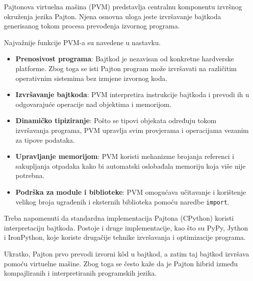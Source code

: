 Pajtonova virtuelna mašina (PVM) predstavlja centralnu komponentu izvršnog okruženja jezika Pajton. Njena osnovna uloga jeste izvršavanje bajtkoda generisanog tokom procesa prevođenja izvornog programa.

Najvažnije funkcije PVM-a su navedene u nastavku. 

\begin{itemize}
	
	\item \textbf{Prenosivost programa}: Bajtkod je nezavisan od konkretne hardverske platforme. Zbog toga se isti Pajton program može izvršavati na različitim operativnim sistemima bez izmjene izvornog koda.
	
	\item \textbf{Izvršavanje bajtkoda}: PVM interpretira instrukcije bajtkoda i prevodi ih u odgovarajuće operacije nad objektima i memorijom.
	
	\item \textbf{Dinamičko tipiziranje}:  Pošto se tipovi objekata određuju tokom izvršavanja programa, PVM upravlja svim provjerama i operacijama vezanim za tipove podataka.
	
	\item \textbf{Upravljanje memorijom}: PVM koristi mehanizme brojanja referenci i sakupljanja otpadaka kako bi automatski oslobađala memoriju koja više nije potrebna.
	
	\item \textbf{Podrška za module i biblioteke}:  PVM omogućava učitavanje i korištenje velikog broja ugrađenih i eksternih biblioteka pomoću naredbe \texttt{import}.

\end{itemize}

Treba napomenuti da standardna implementacija Pajtona (CPython) koristi interpretaciju bajtkoda. Postoje i druge implementacije, kao što su PyPy, Jython i IronPython, koje koriste drugačije tehnike izvršavanja i optimizacije programa.

Ukratko, Pajton prvo prevodi izvorni kôd u bajtkod, a zatim taj bajtkod izvršava pomoću virtuelne mašine. Zbog toga se često kaže da je Pajton hibrid između kompajliranih i interpretiranih programskih jezika.


